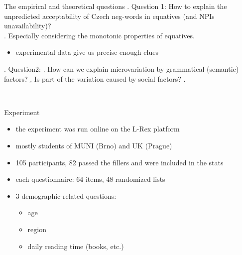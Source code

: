 \documentclass[
  ignorenonframetext,
]{beamer}
\providecommand{\tightlist}{%
  \setlength{\itemsep}{0pt}\setlength{\parskip}{0pt}}
\begin{document}
\begin{frame}
\begin{block}{The empirical and theoretical questions}
\protect\hypertarget{the-empirical-and-theoretical-questions}{}
\ex. Question 1: How to explain the unpredicted acceptability of Czech
neg-words in equatives (and NPIs unavailability)?\\
\a. Especially considering the monotonic properties of equatives.

\begin{itemize}
\tightlist
\item
  experimental data give us precise enough clues
\end{itemize}

\ex. Question2: \a. How can we explain microvariation by grammatical
(semantic) factors? \b. Is part of the variation caused by social
factors? \z.

~
\end{block}
\end{frame}

\begin{frame}{Experiment}
\protect\hypertarget{experiment}{}
\begin{itemize}
\tightlist
\item
  the experiment was run online on the L-Rex platform
\item
  mostly students of MUNI (Brno) and UK (Prague)
\item
  105 participants, 82 passed the fillers and were included in the stats
\item
  each questionnaire: 64 items, 48 randomized lists
\item
  3 demographic-related questions:

  \begin{itemize}
  \tightlist
  \item
    age
  \item
    region
  \item
    daily reading time (books, etc.)
  \end{itemize}
\end{itemize}
\end{frame}
\end{document}
